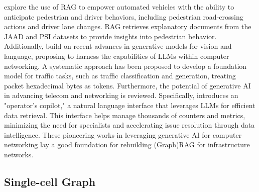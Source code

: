 \citet{hussien2024rag} explore the use of RAG to empower automated vehicles with the ability to anticipate pedestrian and driver behaviors, including pedestrian road-crossing actions and driver lane changes. RAG retrieves explanatory documents from the JAAD and PSI datasets to provide insights into pedestrian behavior. Additionally, \citet{qian2024netbench, wang2024lens, liu2024large, bariah2024large} build on recent advances in generative models for vision and language, proposing to harness the capabilities of LLMs within computer networking. A systematic approach has been proposed to develop a foundation model for traffic tasks, such as traffic classification and generation, treating packet hexadecimal bytes as tokens. Furthermore, the potential of generative AI in advancing telecom and networking is reviewed. Specifically, \citet{kotaru2023adapting} introduces an "operator’s copilot," a natural language interface that leverages LLMs for efficient data retrieval. This interface helps manage thousands of counters and metrics, minimizing the need for specialists and accelerating issue resolution through data intelligence. These pioneering works in leveraging generative AI for computer networking lay a good foundation for rebuilding (Graph)RAG for infrastructure networks.





\subsection{Single-cell Graph \texorpdfstring{\emojibiotitle}{Biological Graph}}

